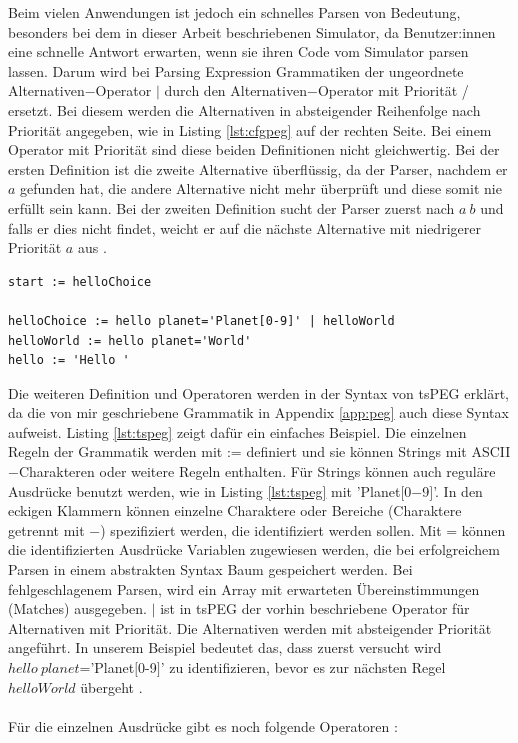 \documentclass[a4paper, 11pt, onecolumn]{article}
\begin{document}
Beim vielen Anwendungen ist jedoch ein schnelles Parsen von Bedeutung, besonders bei dem in dieser Arbeit beschriebenen Simulator, da Benutzer:innen eine schnelle Antwort erwarten, wenn sie ihren Code vom Simulator parsen lassen. Darum wird bei Parsing Expression Grammatiken der ungeordnete Alternativen$-$Operator $\mid$ durch den Alternativen$-$Operator mit Priorität / ersetzt. Bei diesem werden die Alternativen in absteigender Reihenfolge nach Priorität angegeben, wie in Listing \ref{lst:cfgpeg} auf der rechten Seite. Bei einem Operator mit Priorität sind diese beiden Definitionen nicht gleichwertig. Bei der ersten Definition ist die zweite Alternative überflüssig, da der Parser, nachdem er $a$ gefunden hat, die andere Alternative nicht mehr überprüft und diese somit nie erfüllt sein kann. Bei der zweiten Definition sucht der Parser zuerst nach $a~b$ und falls er dies nicht findet, weicht er auf die nächste Alternative mit niedrigerer Priorität $a$ aus \cite{peg}.\\

\begin{lstlisting}[basicstyle=\ttfamily\footnotesize, backgroundcolor=\color{backcolour}, caption={[Hello World Beispiel tsPEG]Angepasstes Hello World Beispiel für tsPEG \cite{tspeg}},captionpos=b, label={lst:tspeg}]
start := helloChoice

helloChoice := hello planet='Planet[0-9]' | helloWorld
helloWorld := hello planet='World'
hello := 'Hello '
\end{lstlisting}

Die weiteren Definition und Operatoren werden in der Syntax von tsPEG erklärt, da die von mir geschriebene Grammatik in Appendix \ref{app:peg} auch diese Syntax aufweist. Listing \ref{lst:tspeg} zeigt dafür ein einfaches Beispiel. Die einzelnen Regeln der Grammatik werden mit := definiert und sie können Strings mit ASCII$-$Charakteren oder weitere Regeln enthalten. Für Strings können auch reguläre Ausdrücke benutzt werden, wie in Listing \ref{lst:tspeg} mit 'Planet$[$0$-$9$]$'. In den eckigen Klammern können einzelne Charaktere oder Bereiche (Charaktere getrennt mit $-$) spezifiziert werden, die identifiziert werden sollen. Mit = können die identifizierten Ausdrücke Variablen zugewiesen werden, die bei erfolgreichem Parsen in einem abstrakten Syntax Baum gespeichert werden. Bei fehlgeschlagenem Parsen, wird ein Array mit erwarteten Übereinstimmungen (Matches) ausgegeben. $\mid$ ist in tsPEG der vorhin beschriebene Operator für Alternativen mit Priorität. Die Alternativen werden mit absteigender Priorität angeführt. In unserem Beispiel bedeutet das, dass zuerst versucht wird $hello~planet$='Planet$[$0-9$]$' zu identifizieren, bevor es zur nächsten Regel $helloWorld$ übergeht \cite{tspeg}.\\ \\
Für die einzelnen Ausdrücke gibt es noch folgende Operatoren \cite{tspeg}:
\end{document}
